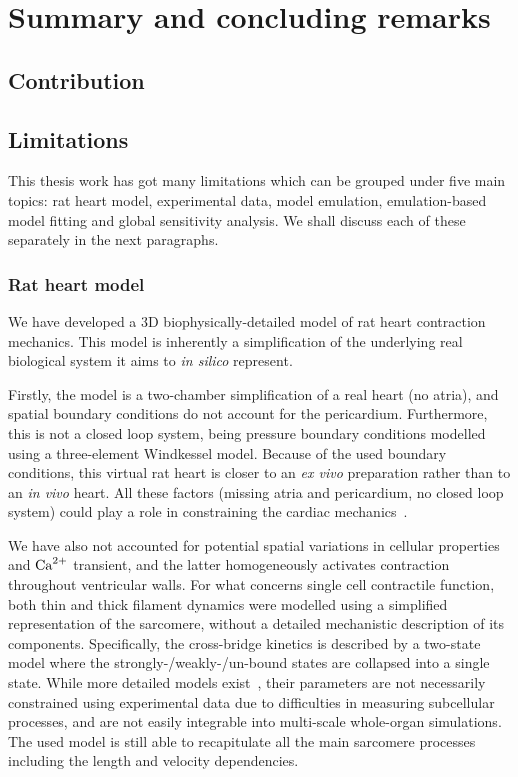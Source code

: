 \chapter{Summary and concluding remarks}\label{cha:chapter9}
%
%
%
\section{Contribution}\label{sec:ch9contribution}


%
%
%
\section{Limitations}\label{sec:ch9limitations}
This thesis work has got many limitations which can be grouped under five main topics: rat heart model, experimental data, model emulation, emulation-based model fitting and global sensitivity analysis. We shall discuss each of these separately in the next paragraphs.


%
%
%
\subsection{Rat heart model}\label{sec:ch9rat_heart_model}
We have developed a $3$D biophysically-detailed model of rat heart contraction mechanics. This model is inherently a simplification of the underlying real biological system it aims to \textit{in silico} represent.

\vspace{0.2cm}
Firstly, the model is a two-chamber simplification of a real heart (no atria), and spatial boundary conditions do not account for the pericardium. Furthermore, this is not a closed loop system, being pressure boundary conditions modelled using a three-element Windkessel model. Because of the used boundary conditions, this virtual rat heart is closer to an \textit{ex vivo} preparation rather than to an \textit{in vivo} heart. All these factors (missing atria and pericardium, no closed loop system) could play a role in constraining the cardiac mechanics~\cite{Strocchi:2020}.

\vspace{0.2cm}
We have also not accounted for potential spatial variations in cellular properties and $\textrm{Ca}^{2+}$ transient, and the latter homogeneously activates contraction throughout ventricular walls. For what concerns single cell contractile function, both thin and thick filament dynamics were modelled using a simplified representation of the sarcomere, without a detailed mechanistic description of its components. Specifically, the cross-bridge kinetics is described by a two-state model where the strongly-/weakly-/un-bound states are collapsed into a single state. While more detailed models exist~\cite{Land:2015}, their parameters are not necessarily constrained using experimental data due to difficulties in measuring subcellular processes, and are not easily integrable into multi-scale whole-organ simulations. The used model is still able to recapitulate all the main sarcomere processes including the length and velocity dependencies.


